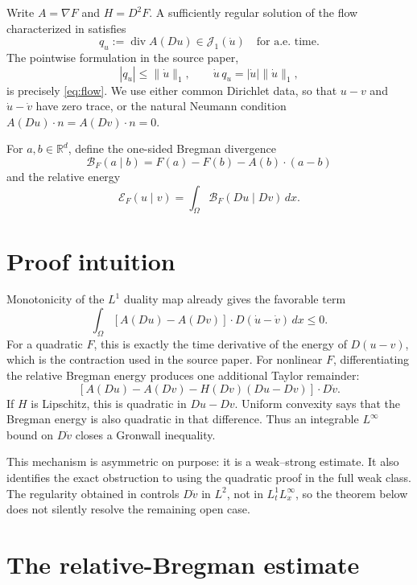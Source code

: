 \documentclass[11pt]{article}
\newcommand{\Om}{\Omega}
\newcommand{\R}{\mathbb R}
\newcommand{\Div}{\operatorname{div}}
\newcommand{\Breg}{\mathcal B_F}
\newcommand{\Erel}{\mathcal E_F}
\newcommand{\J}{\mathcal J_1}
\begin{document}
Write $A=\nabla F$ and $H=D^2F$.  A sufficiently regular solution of the
flow characterized in \cite[Theorem 2.15]{CN} satisfies
\begin{equation}\label{eq:flow}
  q_u:=\Div A(Du)\in\J(\dot u)
  \quad\text{for a.e. time}.
\end{equation}
The pointwise formulation in the source paper,
\[
 |q_u|\le\|\dot u\|_1,
 \qquad \dot u\,q_u=|\dot u|\|\dot u\|_1,
\]
is precisely \eqref{eq:flow}.  We use either common Dirichlet data, so that
$u-v$ and $\dot u-\dot v$ have zero trace, or the natural Neumann condition
$A(Du)\cdot n=A(Dv)\cdot n=0$.

For $a,b\in\R^d$, define the one-sided Bregman divergence
\[
  \Breg(a\mid b)=F(a)-F(b)-A(b)\cdot(a-b)
\]
and the relative energy
\[
  \Erel(u\mid v)=\int_\Om \Breg(Du\mid Dv)\,dx.
\]

\section{Proof intuition}

Monotonicity of the $L^1$ duality map already gives the favorable term
\[
 \int_\Om [A(Du)-A(Dv)]\cdot D(\dot u-\dot v)\,dx\le0.
\]
For a quadratic $F$, this is exactly the time derivative of the energy of
$D(u-v)$, which is the contraction used in the source paper.  For nonlinear
$F$, differentiating the relative Bregman energy produces one additional
Taylor remainder:
\[
 [A(Du)-A(Dv)-H(Dv)(Du-Dv)]\cdot D\dot v.
\]
If $H$ is Lipschitz, this is quadratic in $Du-Dv$.  Uniform convexity says
that the Bregman energy is also quadratic in that difference.  Thus an
integrable $L^\infty$ bound on $D\dot v$ closes a Gronwall inequality.

This mechanism is asymmetric on purpose: it is a weak--strong estimate.
It also identifies the exact obstruction to using the quadratic proof in
the full weak class.  The regularity obtained in \cite{CN} controls
$D\dot v$ in $L^2$, not in $L^1_tL^\infty_x$, so the theorem below does not
silently resolve the remaining open case.

\section{The relative-Bregman estimate}
\end{document}
